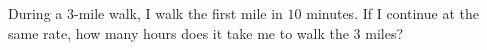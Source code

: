 During a $3$-mile walk, I walk the first mile in $10$ minutes. If I continue at the same rate, how many hours does it take me to walk the $3$ miles?
